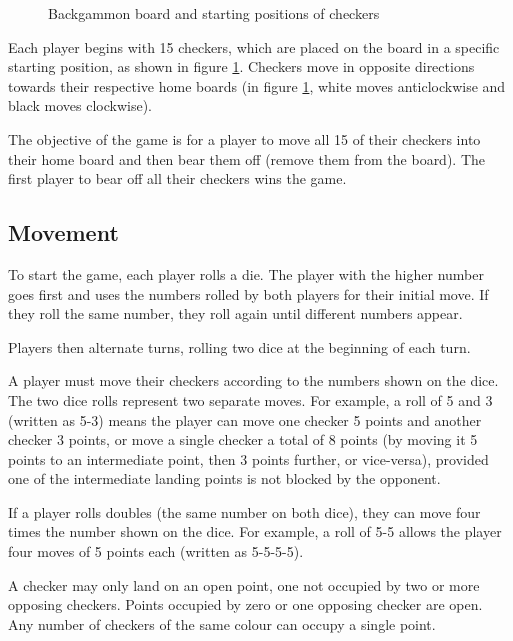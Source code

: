 \begin{figure}[H]
    \caption{Backgammon board and starting positions of checkers}
    \label{fig:backgammonboard}
\end{figure}


Each player begins with 15 checkers, which are placed on the board in a specific starting position, as shown in figure \ref{fig:backgammonboard}.
Checkers move in opposite directions towards their respective home boards (in figure \ref{fig:backgammonboard}, white moves anticlockwise and black moves clockwise).

The objective of the game is for a player to move all 15 of their checkers into their home board and then bear them off (remove them from the board). 
The first player to bear off all their checkers wins the game.

\subsection{Movement}
To start the game, each player rolls a die. 
The player with the higher number goes first and uses the numbers rolled by both players for their initial move. 
If they roll the same number, they roll again until different numbers appear.

Players then alternate turns, rolling two dice at the beginning of each turn.

A player must move their checkers according to the numbers shown on the dice. 
The two dice rolls represent two separate moves. 
For example, a roll of 5 and 3 (written as 5-3) means the player can move one checker 5 points and another checker 3 points, or move a single checker a total of 8 points (by moving it 5 points to an intermediate point, then 3 points further, or vice-versa), provided one of the intermediate landing points is not blocked by the opponent.

If a player rolls doubles (the same number on both dice), they can move four times the number shown on the dice. 
For example, a roll of 5-5 allows the player four moves of 5 points each (written as 5-5-5-5).

A checker may only land on an open point, one not occupied by two or more opposing checkers. 
Points occupied by zero or one opposing checker are open. Any number of checkers of the same colour can occupy a single point.

